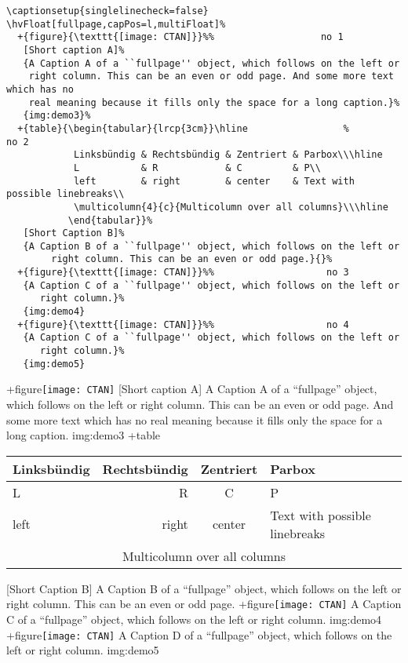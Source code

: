 \documentclass{scrartcl}
\begin{document}
\begin{lstlisting}
\captionsetup{singlelinecheck=false}
\hvFloat[fullpage,capPos=l,multiFloat]%
  +{figure}{\texttt{[image: CTAN]}}%%                   no 1
   [Short caption A]%
   {A Caption A of a ``fullpage'' object, which follows on the left or
    right column. This can be an even or odd page. And some more text which has no
    real meaning because it fills only the space for a long caption.}%
   {img:demo3}%
  +{table}{\begin{tabular}{lrcp{3cm}}\hline                 %             no 2
            Linksbündig & Rechtsbündig & Zentriert & Parbox\\\hline
            L           & R            & C         & P\\
            left        & right        & center    & Text with possible linebreaks\\
            \multicolumn{4}{c}{Multicolumn over all columns}\\\hline
           \end{tabular}}%
   [Short Caption B]%
   {A Caption B of a ``fullpage'' object, which follows on the left or
        right column. This can be an even or odd page.}{}%
  +{figure}{\texttt{[image: CTAN]}}%%                    no 3
   {A Caption C of a ``fullpage'' object, which follows on the left or
      right column.}%
   {img:demo4}
  +{figure}{\texttt{[image: CTAN]}}%%                    no 4
   {A Caption C of a ``fullpage'' object, which follows on the left or
      right column.}%
   {img:demo5}
\end{lstlisting}

\Float[Multi]
\captionsetup{singlelinecheck=false}
\hvFloat[fullpage,capPos=l,multiFloat]%
  +{figure}{\texttt{[image: CTAN]}}%
   [Short caption A]%
   {A Caption A of a ``fullpage'' object, which follows on the left or
    right column. This can be an even or odd page. And some more text which has no
    real meaning because it fills only the space for a long caption.}%
   {img:demo3}%
  +{table}{\begin{tabular}{lrcp{3cm}}\hline                 %
            Linksbündig & Rechtsbündig & Zentriert & Parbox\\\hline
            L           & R            & C         & P\\
            left        & right        & center    & Text with possible linebreaks\\
            \multicolumn{4}{c}{Multicolumn over all columns}\\\hline
           \end{tabular}}%
   [Short Caption B]%
   {A Caption B of a ``fullpage'' object, which follows on the left or
        right column. This can be an even or odd page.}{}%
  +{figure}{\texttt{[image: CTAN]}}%
   {A Caption C of a ``fullpage'' object, which follows on the left or
      right column.}%
   {img:demo4}
  +{figure}{\texttt{[image: CTAN]}}%
   {A Caption D of a ``fullpage'' object, which follows on the left or
      right column.}%
   {img:demo5}


\blinddocument

\Blindtext

\blindtext
\end{document}
